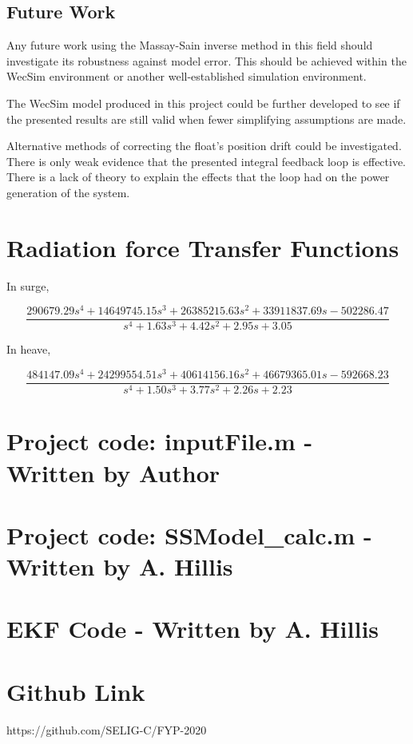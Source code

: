 \documentclass{report}
\begin{document}
\section{Future Work}

Any future work using the Massay-Sain inverse method in this field should investigate its robustness against model error. This should be achieved within the WecSim environment or another well-established simulation environment.

The WecSim model produced in this project could be further developed to see if the presented results are still valid when fewer simplifying assumptions are made.

Alternative methods of correcting the float's position drift could be investigated. There is only weak evidence that the presented integral feedback loop is effective. There is a lack of theory to explain the effects that the loop had on the power generation of the system.





\appendix
\appendixpage
\addappheadtotoc
\chapter{Radiation force Transfer Functions}
\label{radiationTFs}

In surge,

\[
\frac{290679.29s^4 + 14649745.15 s^3 + 26385215.63 s^2 + 33911837.69s -502286.47}{s^4 + 1.63s^3 + 4.42s^2 + 2.95s + 3.05}
\]

In heave,

\[
\frac{484147.09s^4 + 24299554.51s^3 + 40614156.16s^2 + 46679365.01s -592668.23}{s^4 + 1.50s^3 + 3.77s^2 + 2.26s + 2.23}
\]


\chapter{Project code: inputFile.m - Written by Author}
\label{inputFile}


\chapter{Project code: SSModel\_calc.m - Written by A. Hillis}


\chapter{EKF Code - Written by A. Hillis}
\label{EKFCode}


\chapter{Github Link}
\label{github}
\textup{https://github.com/SELIG-C/FYP-2020}
\end{document}
